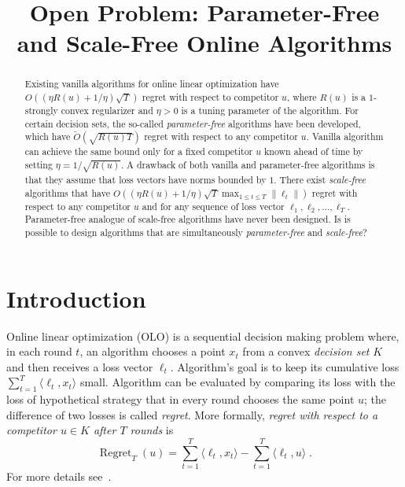 \documentclass{colt2016} %
\title{Open Problem: Parameter-Free and Scale-Free Online Algorithms}
\DeclareMathOperator{\Regret}{Regret}
\newcommand{\norm}[1]{\left\|{#1}\right\|}
\begin{document}
\maketitle

\begin{abstract}
Existing vanilla algorithms for online linear optimization have
$O((\eta R(u) + 1/\eta) \sqrt{T})$ regret with respect to competitor $u$,
where $R(u)$ is a $1$-strongly convex regularizer and $\eta > 0$ is a
tuning parameter of the algorithm. For certain decision sets, the
so-called \emph{parameter-free} algorithms have been developed, which have
$\widetilde O(\sqrt{R(u) T})$ regret with respect to any competitor $u$.
Vanilla algorithm can achieve the same bound only for a fixed competitor
$u$ known ahead of time by setting $\eta = 1/\sqrt{R(u)}$. A drawback of
both vanilla and parameter-free algorithms is that they assume that loss vectors
have norms bounded by $1$. There exist \emph{scale-free} algorithms that have
$O((\eta R(u) + 1/\eta) \sqrt{T} \max_{1 \le t \le T} \norm{\ell_t})$
regret with respect to any competitor $u$ and for any sequence of loss
vector $\ell_1, \ell_2, \dots, \ell_T$. Parameter-free analogue of scale-free
algorithms have never been designed. Is is possible to design algorithms that
are simultaneously \emph{parameter-free} and \emph{scale-free}?
\end{abstract}

\section{Introduction}

Online linear optimization (OLO) is a sequential decision making problem where,
in each round $t$, an algorithm chooses a point $x_t$ from a convex
\emph{decision set} $K$ and then receives a loss vector $\ell_t$. Algorithm's
goal is to keep its cumulative loss $\sum_{t=1}^T \langle \ell_t, x_t \rangle$
small. Algorithm can be evaluated by comparing its loss with the loss of
hypothetical strategy that in every round chooses the same point $u$; the
difference of two losses is called \emph{regret}. More formally, \emph{regret
with respect to a competitor $u \in K$ after $T$ rounds} is
$$
\Regret_T(u) = \sum_{t=1}^T \langle \ell_t, x_t \rangle - \sum_{t=1}^T \langle \ell_t, u \rangle \; .
$$
For more details see~\cite{Cesa-Bianchi-Lugosi-2006, Shalev-Shwartz-2011}.
\end{document}
